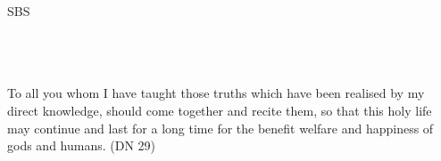 \cleartorecto
\thispagestyle{empty}
\vspace*{5em}

{\centering

\settowidth{\titleLength}{%
  {\Large\chapterTitleFont\textsc{\MakeUppercase{{\thetitle}}}}%
}

{\Huge\fontsize{64}{16}\sbsFont SBS}\\[1.0\baselineskip]%

{\Huge\chapterTitleFont\textsc{{\thetitle\linebreak}}}\\[0.2\baselineskip]

\\[1.4\baselineskip]

{\Large\scshape \thesubtitle}\\[2.5\baselineskip]



{\quote To all you whom I have taught those truths which have been realised by my direct knowledge, should come together and recite them, so that this holy life may continue and last for a long time for the benefit welfare and happiness of gods and humans. (DN 29)}\\[1.4\baselineskip]

}
